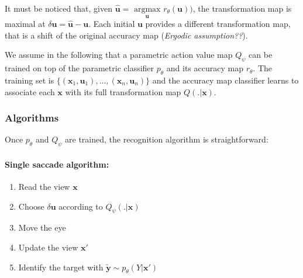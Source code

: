 It must be noticed that, given $\hat{\boldsymbol{u}} = \underset{\boldsymbol{u}}{\text{ argmax }}
r_\theta(\boldsymbol{u}))$,  the transformation map is maximal at $\delta\boldsymbol{u} = \hat{\boldsymbol{u}} - \boldsymbol{u}$. Each initial $\boldsymbol{u}$ provides a different transformation map, that is a shift of the original accuracy map (\emph{Ergodic assumption??}).

We assume in the following that a parametric action value map $Q_\psi$ can be trained on top of the parametric classifier $p_\theta$ and its accuracy map $r_\theta$.
The training set is $\{(\boldsymbol{x}_1, \boldsymbol{u}_1), ..., (\boldsymbol{x}_n, \boldsymbol{u}_n)\}$ and the accuracy map classifier learns to associate each $\boldsymbol{x}$ with its full transformation map $Q(.|\boldsymbol{x})$.



\subsubsection{Algorithms}

Once $p_\theta$ and $Q_\psi$ are trained, the recognition algorithm is straightforward:

\paragraph{Single saccade algorithm:}
\begin{enumerate}
	\item Read the view $\boldsymbol{x}$
	\item Choose $\delta\boldsymbol{u}$ according to $Q_\psi(.|\boldsymbol{x})$
	\item Move the eye
	\item Update the view $\boldsymbol{x}'$
	\item Identify the target with $\tilde{\boldsymbol{y}} \sim p_\theta(Y|\boldsymbol{x}')$
\end{enumerate}


